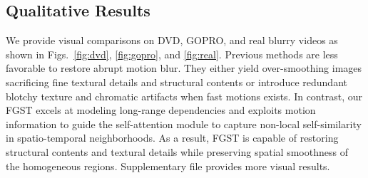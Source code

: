 \documentclass{article}
\begin{document}
	\subsection{Qualitative Results}
	\vspace{-1mm}
	We provide visual comparisons on DVD, GOPRO, and real blurry videos as shown in Figs.~\ref{fig:dvd}, \ref{fig:gopro}, and \ref{fig:real}. Previous methods are less favorable to restore abrupt motion blur. They either yield over-smoothing images sacrificing fine textural details and structural contents or introduce redundant blotchy texture and chromatic artifacts when fast motions exists. In contrast, our FGST excels at modeling long-range dependencies and exploits motion information to guide the self-attention module to capture non-local self-similarity in spatio-temporal neighborhoods. As a result, FGST is capable of restoring  structural contents and textural details while preserving spatial smoothness of the homogeneous regions. Supplementary file provides more visual results.
\end{document}
